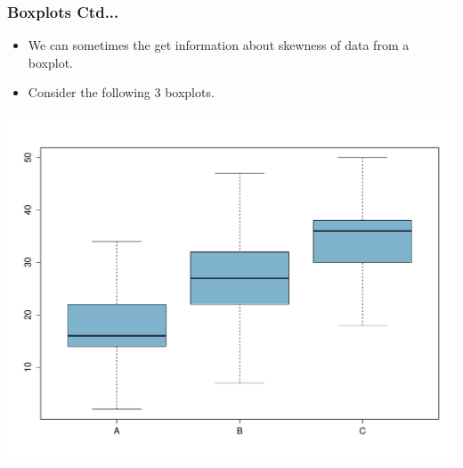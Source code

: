 \documentclass[xcolor=svgnames, compress]{beamer}
\begin{document}
\begin{frame}[t]
\frametitle{Boxplots Ctd...}

\small

\vspace{-0.25cm}
\begin{itemize}
\justifying
\item	We can sometimes the get information about skewness of data from a boxplot.\\
\item	Consider the following 3 boxplots.
\end{itemize}
\vspace{-0.45cm}
\begin{center}
\includegraphics[scale=0.265]{boxplot_abc.pdf}
\end{center}

\end{frame}
\end{document}
